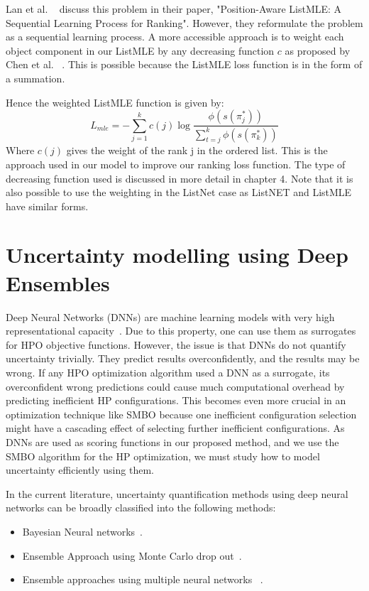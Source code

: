 \documentclass[12pt, twoside, ngerman]{report}
\begin{document}
Lan et al. ~\cite{positionawarerankinglistmle} discuss this problem in their paper,  "Position-Aware ListMLE: A Sequential Learning Process for Ranking".
However,  they reformulate the problem as a sequential learning process.
A more accessible approach is to weight each object component in our ListMLE by any decreasing function $c$ as proposed by Chen
 et al. ~\cite{TRLWO}.
This is possible because the ListMLE loss function is in the form of a summation.

Hence the weighted ListMLE function is given by:
\begin{equation}
L_{mle} = -  \sum\limits_{j=1}^{k} c(j) \log \frac{\phi(s(\pi^*_j))}{ \sum\limits_{t=j}^k \phi(s(\pi^*_k))}
\end{equation}
Where $c(j)$ gives the weight of the rank j in the ordered list.
This is the approach used in our model to improve our ranking loss function.
The type of decreasing function used is discussed in more detail in chapter 4.
Note that it is also possible to use the weighting in the ListNet case as ListNET and ListMLE have similar forms.

\section{Uncertainty modelling using Deep Ensembles}\label{sec:uncertaintyDeepEnsembles}

Deep Neural Networks (DNNs) are machine learning models with very high representational capacity~\cite{Goodfellow-et-al-2016}.
Due to this property,  one can use them as surrogates for HPO objective functions.
However, the issue is that DNNs do not quantify uncertainty trivially.
They predict results overconfidently, and the results may be wrong.
If any HPO optimization algorithm used a DNN as a surrogate,  its overconfident wrong predictions could cause much computational overhead by predicting inefficient HP configurations.
This becomes even more crucial in an optimization technique like SMBO because one inefficient configuration selection might have a cascading effect of selecting further inefficient configurations.
As DNNs are used as scoring functions in our proposed method, and we use the SMBO algorithm for the HP optimization, we must study how to model uncertainty efficiently using them.

In the current literature,  uncertainty quantification methods using deep neural networks can be broadly classified into the following methods:
\begin{itemize}
\item Bayesian Neural networks~\cite{Goan-2020}.
\item Ensemble Approach using Monte Carlo drop out~\cite{JMLR:v15:srivastava14a}.
\item Ensemble approaches using multiple neural networks ~\cite{DeepEnsemblePaper}.
\end{itemize}
\end{document}
